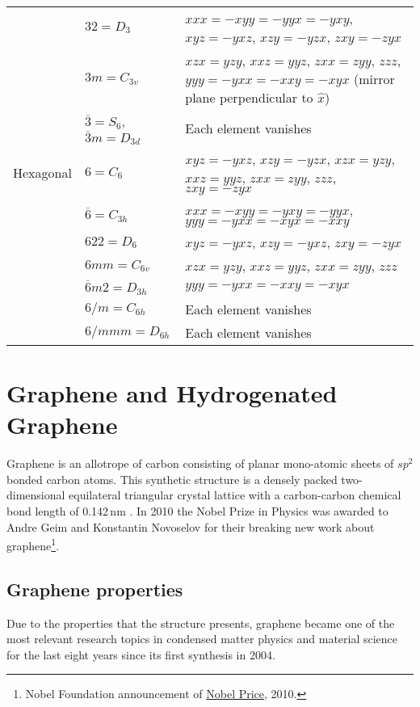\begin{table}[H]
\begin{tabular}{llp{9cm}}
\\ &
$32=D_{3}$ &
$xxx=-xyy=-yyx=-yxy$, $xyz=-yxz$, $xzy=-yzx$, $zxy=-zyx$
\\ &
$3m = C_{3v}$ &
$xzx=yzy$, $xxz=yyz$, $zxx=zyy$, $zzz$, $yyy=-yxx=-xxy=-xyx$ (mirror plane
perpendicular to $\hat{x}$)
\\ &
$\overline{3}= S_{6}$, $\overline{3}m=D_{3d}$ &
Each element vanishes
\\
\hline
Hexagonal &
$6=C_{6}$ &
$xyz=-yxz$, $xzy=-yzx$, $xzx=yzy$, $xxz=yyz$, $zxx=zyy$, $zzz$, $zxy=-zyx$
\\ &
$\overline{6}=C_{3h}$ &
$xxx=-xyy=-yxy=-yyx$, $yyy=-yxx=-xyx=-xxy$
\\ &
$622=D_{6}$ &
$xyz=-yxz$, $xzy=-yxz$, $zxy=-zyx$
\\ &
$6mm = C_{6v}$ &
$xzx=yzy$, $xxz=yyz$, $zxx=zyy$, $zzz$
\\ &
$\overline{6}m2=D_{3h}$ &
$yyy=-yxx=-xxy=-xyx$
\\ &
$6/m = C_{6h}$ &
Each element vanishes
\\ &
$6/mmm = D_{6h}$ &
Each element vanishes
\\
\hline
\hline
\end{tabular}
\end{table}

\section{Graphene and Hydrogenated Graphene}
\label{sec:graphene_and_hydrogenated_graphene}

Graphene is an allotrope of carbon consisting of planar mono-atomic sheets of
$sp^{2}$ bonded carbon atoms. This synthetic structure is a densely packed 
two-dimensional equilateral triangular crystal lattice \cite{geim07Nat} with a
carbon-carbon chemical bond length of 0.142\,nm \cite{rao09JMC}. 
% 
In 2010 the Nobel Prize in Physics was awarded to Andre Geim and Konstantin
Novoselov for their breaking new work about graphene\footnote{Nobel Foundation
announcement of
\href{http://nobelprize.org/nobel_prizes/physics/laureates/2010/}{Nobel Price},
2010.}.

\subsection{Graphene properties}
\label{sec:graphene_properties}

Due to the properties that the structure presents, graphene became one of the
most relevant research topics in condensed matter physics and material science
for the last eight years \cite{geim07Nat, rao09JMC, li08NN,
katsnelson07MT, rao10PChL} since its first synthesis in 2004.

\stopcontents[chapters]

















